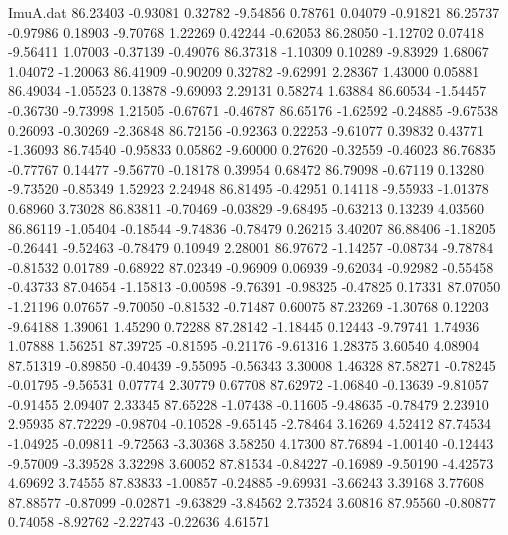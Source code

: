 \begin{filecontents}{ImuA.dat}
  86.23403   -0.93081    0.32782   -9.54856    0.78761    0.04079   -0.91821
  86.25737   -0.97986    0.18903   -9.70768    1.22269    0.42244   -0.62053
  86.28050   -1.12702    0.07418   -9.56411    1.07003   -0.37139   -0.49076
  86.37318   -1.10309    0.10289   -9.83929    1.68067    1.04072   -1.20063
  86.41909   -0.90209    0.32782   -9.62991    2.28367    1.43000    0.05881
  86.49034   -1.05523    0.13878   -9.69093    2.29131    0.58274    1.63884
  86.60534   -1.54457   -0.36730   -9.73998    1.21505   -0.67671   -0.46787
  86.65176   -1.62592   -0.24885   -9.67538    0.26093   -0.30269   -2.36848
  86.72156   -0.92363    0.22253   -9.61077    0.39832    0.43771   -1.36093
  86.74540   -0.95833    0.05862   -9.60000    0.27620   -0.32559   -0.46023
  86.76835   -0.77767    0.14477   -9.56770   -0.18178    0.39954    0.68472
  86.79098   -0.67119    0.13280   -9.73520   -0.85349    1.52923    2.24948
  86.81495   -0.42951    0.14118   -9.55933   -1.01378    0.68960    3.73028
  86.83811   -0.70469   -0.03829   -9.68495   -0.63213    0.13239    4.03560
  86.86119   -1.05404   -0.18544   -9.74836   -0.78479    0.26215    3.40207
  86.88406   -1.18205   -0.26441   -9.52463   -0.78479    0.10949    2.28001
  86.97672   -1.14257   -0.08734   -9.78784   -0.81532    0.01789   -0.68922
  87.02349   -0.96909    0.06939   -9.62034   -0.92982   -0.55458   -0.43733
  87.04654   -1.15813   -0.00598   -9.76391   -0.98325   -0.47825    0.17331
  87.07050   -1.21196    0.07657   -9.70050   -0.81532   -0.71487    0.60075
  87.23269   -1.30768    0.12203   -9.64188    1.39061    1.45290    0.72288
  87.28142   -1.18445    0.12443   -9.79741    1.74936    1.07888    1.56251
  87.39725   -0.81595   -0.21176   -9.61316    1.28375    3.60540    4.08904
  87.51319   -0.89850   -0.40439   -9.55095   -0.56343    3.30008    1.46328
  87.58271   -0.78245   -0.01795   -9.56531    0.07774    2.30779    0.67708
  87.62972   -1.06840   -0.13639   -9.81057   -0.91455    2.09407    2.33345
  87.65228   -1.07438   -0.11605   -9.48635   -0.78479    2.23910    2.95935
  87.72229   -0.98704   -0.10528   -9.65145   -2.78464    3.16269    4.52412
  87.74534   -1.04925   -0.09811   -9.72563   -3.30368    3.58250    4.17300
  87.76894   -1.00140   -0.12443   -9.57009   -3.39528    3.32298    3.60052
  87.81534   -0.84227   -0.16989   -9.50190   -4.42573    4.69692    3.74555
  87.83833   -1.00857   -0.24885   -9.69931   -3.66243    3.39168    3.77608
  87.88577   -0.87099   -0.02871   -9.63829   -3.84562    2.73524    3.60816
  87.95560   -0.80877    0.74058   -8.92762   -2.22743   -0.22636    4.61571

\end{filecontents}
